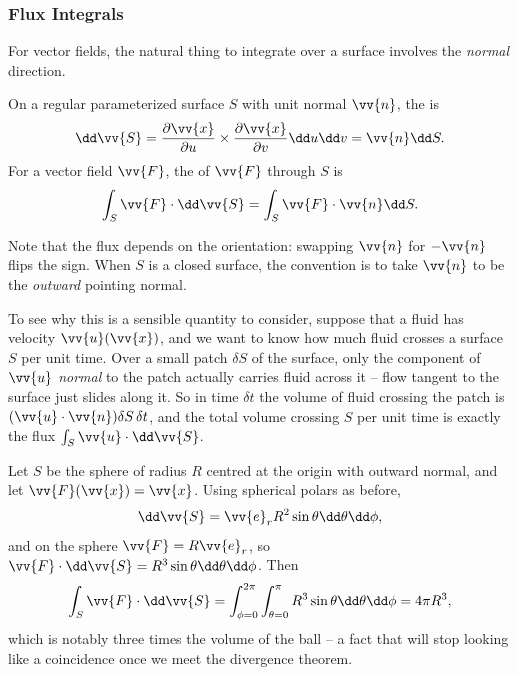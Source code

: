 \subsubsection{Flux Integrals}

For vector fields, the natural thing to integrate over a surface involves the \emph{normal} direction.

\begin{definition}
	On a regular parameterized surface $S$ with unit normal $\vv{n}$, the  is
	$$
	\dd \vv{S} = \frac{\partial \vv{x}}{\partial u} \times \frac{\partial \vv{x}}{\partial v} \dd u \dd v = \vv{n} \dd S.
	$$
	For a vector field $\vv{F}$, the  of $\vv{F}$ through $S$ is
	$$
	\int_S \vv{F} \cdot \dd \vv{S} = \int_S \vv{F} \cdot \vv{n} \dd S.
	$$
\end{definition}

Note that the flux depends on the orientation: swapping $\vv{n}$ for $-\vv{n}$ flips the sign. When $S$ is a closed surface, the convention is to take $\vv{n}$ to be the \emph{outward} pointing normal.

To see why this is a sensible quantity to consider, suppose that a fluid has velocity $\vv{u}(\vv{x})$, and we want to know how much fluid crosses a surface $S$ per unit time. Over a small patch $\delta S$ of the surface, only the component of $\vv{u}$ \emph{normal} to the patch actually carries fluid across it -- flow tangent to the surface just slides along it. So in time $\delta t$ the volume of fluid crossing the patch is $(\vv{u} \cdot \vv{n}) \delta S \, \delta t$, and the total volume crossing $S$ per unit time is exactly the flux $\int_S \vv{u} \cdot \dd \vv{S}$.

\begin{center}
\end{center}

\begin{example}
	Let $S$ be the sphere of radius $R$ centred at the origin with outward normal, and let $\vv{F}(\vv{x}) = \vv{x}$. Using spherical polars as before,
	$$
	\dd \vv{S} = \vv{e}_r R^2 \sin \theta \dd \theta \dd \phi,
	$$
	and on the sphere $\vv{F} = R \vv{e}_r$, so $\vv{F} \cdot \dd \vv{S} = R^3 \sin \theta \dd \theta \dd \phi$. Then
	$$
	\int_S \vv{F} \cdot \dd \vv{S} = \int_{\phi = 0}^{2\pi} \int_{\theta = 0}^{\pi} R^3 \sin \theta \dd \theta \dd \phi = 4 \pi R^3,
	$$
	which is notably three times the volume of the ball -- a fact that will stop looking like a coincidence once we meet the divergence theorem.
\end{example}

